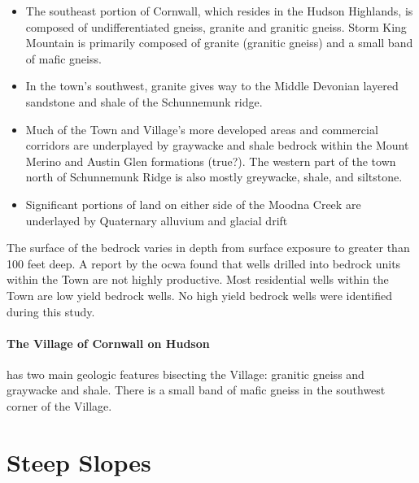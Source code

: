 \begin{itemize}
    \item The southeast portion of Cornwall, which resides in the Hudson 
Highlands, is composed of undifferentiated gneiss, granite and granitic gneiss. 
Storm King Mountain is primarily composed of granite (granitic gneiss) and a 
small band of mafic gneiss.
    \item In the town's southwest, granite gives way to the Middle Devonian 
layered sandstone and shale of the Schunnemunk ridge.
  \item Much of the Town and Village’s more developed areas and commercial corridors 
    are underplayed by graywacke and shale bedrock within the Mount Merino and 
    Austin Glen formations (true?). The western part of the town north of 
    Schunnemunk Ridge is also mostly greywacke, shale, and siltstone.
    \item Significant portions of land on either side of the Moodna Creek are 
    underlayed by Quaternary alluvium and glacial drift
\end{itemize}
The surface of the bedrock varies in depth from surface exposure to greater 
than 100 feet deep. A report by the \gls{ocwa} found that 
wells drilled into bedrock units within the Town are not highly productive. 
Most residential wells within the Town are low yield bedrock wells. No high 
yield bedrock wells were identified during this study.

\paragraph{The Village of Cornwall on Hudson} has two main geologic features bisecting the 
Village: granitic gneiss and graywacke and shale. There is a small band of 
mafic gneiss in the southwest corner of the Village.

\section{Steep Slopes}\label{subsec:steepsloes}

